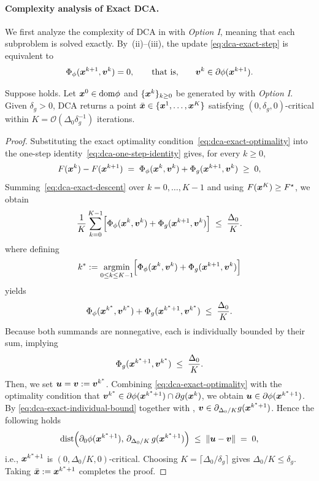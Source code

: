 \paragraph{Complexity analysis of Exact DCA.} We first analyze the complexity of DCA in  with \emph{Option I}, meaning that each subproblem is solved exactly. By \,(ii)--(iii), the update
\eqref{eq:dca-exact-step} is equivalent to
\begin{equation}
    \Phi_\phi(\bm{x}^{k+1},\bm{v}^k)=0,
    \qquad\text{that is,}\qquad
    \bm{v}^k\in\partial\phi(\bm{x}^{k+1}).
    \label{eq:dca-exact-optimality}
\end{equation}

\begin{theorem}
\label{thm:dca-exact-complexity}
Suppose  holds. Let $\bm{x}^0\in\mathrm{dom}\phi$ and
$\{\bm{x}^k\}_{k\ge0}$ be generated by  with \emph{Option I}.
Given $\delta_g>0$, DCA returns a point $\bar{\bm{x}}\in\{\bm{x}^1,\ldots,\bm{x}^K\}$
satisfying $(0,\delta_g,0)$-critical within
$K=\mathcal O(\Delta_0 \delta_g^{-1})$ iterations.
\end{theorem}

\begin{proof}
Substituting the exact optimality condition~\eqref{eq:dca-exact-optimality}
into the one-step identity~\eqref{eq:dca-one-step-identity} gives, for
every $k\ge0$,
\begin{equation}
    F(\bm{x}^k)-F(\bm{x}^{k+1})
    \;=\;
    \Phi_\phi(\bm{x}^k,\bm{v}^k)+\Phi_g(\bm{x}^{k+1},\bm{v}^k)
    \;\ge\;0,
    \label{eq:dca-exact-descent}
\end{equation}
Summing~\eqref{eq:dca-exact-descent} over $k=0,\ldots,K-1$
and using $F(\bm{x}^K)\ge F^\star$, we obtain
\[
    \frac1K\sum_{k=0}^{K-1}
    \Bigl[
        \Phi_\phi(\bm{x}^k,\bm{v}^k)+\Phi_g(\bm{x}^{k+1},\bm{v}^k)
    \Bigr]
    \;\le\;
    \frac{\Delta_0}{K}.
\] where defining
\[
    k^*:=\operatorname*{\mathrm{argmin}}_{0\le k\le K-1}
    \Bigl[
        \Phi_\phi(\bm{x}^k,\bm{v}^k)+\Phi_g(\bm{x}^{k+1},\bm{v}^k)
    \Bigr]
\]
yields
\[
    \Phi_\phi(\bm{x}^{k^*},\bm{v}^{k^*})+\Phi_g(\bm{x}^{k^*+1},\bm{v}^{k^*})
    \;\le\;\frac{\Delta_0}{K}.
\]
Because both summands are nonnegative, each is individually bounded by
their sum, implying
\begin{equation}
    \Phi_g(\bm{x}^{k^*+1},\bm{v}^{k^*})\;\le\;\frac{\Delta_0}{K}.
    \label{eq:dca-exact-individual-bound}
\end{equation}
Then, we set $\bm{u}=\bm{v}:=\bm{v}^{k^*}$. Combining
\eqref{eq:dca-exact-optimality} with the optimality condition that $\bm{v}^{k^*}\in\partial\phi(\bm{x}^{k^*+1})\cap\partial g(\bm{x}^k)$, we obtain $\bm{u}\in\partial\phi(\bm{x}^{k^*+1})$. By
\eqref{eq:dca-exact-individual-bound} together with
, $\bm{v}\in\partial_{\Delta_0/K}g(\bm{x}^{k^*+1})$.
Hence the following holds
\[
    \operatorname{dist}
    \Bigl(
        \partial_{0}\phi(\bm{x}^{k^*+1}),\,
        \partial_{\Delta_0/K}\,g(\bm{x}^{k^*+1})
    \Bigr)
    \;\le\;
    \|\bm{u}-\bm{v}\|
    \;=\;
    0,
\] i.e., $\bm{x}^{k^*+1}$ is $(0,\Delta_0/K,0)$-critical. Choosing $K=\lceil\Delta_0/\delta_g\rceil$ gives $\Delta_0/K\le\delta_g$.
Taking $\bar{\bm{x}}:=\bm{x}^{k^*+1}$ completes the proof.
\end{proof}

